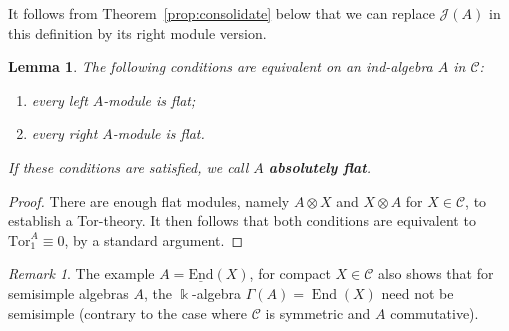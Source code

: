 \documentclass[11pt]{amsart}
\def\End{\operatorname{End}}
\newcommand{\uEnd}{\underline{\mathrm{End}}}
\def\JJ{\mathcal{J}}
\def\cC{\mathscr{C}}
\def\bk{\Bbbk}
\def\Tor{\mathrm{Tor}}
\newtheorem{lemma}[thm]{Lemma}
\theoremstyle{definition}
\theoremstyle{remark}
\newtheorem{remark}[thm]{Remark}
\numberwithin{equation}{section}
\begin{document}
It follows from Theorem~\ref{prop:consolidate} below that we can replace $\JJ(A)$ in this definition by its right module version.


\begin{lemma}
    The following conditions are equivalent on an ind-algebra $A$ in $\cC$:
    \begin{enumerate}
        \item every left $A$-module is flat;
        \item every right $A$-module is flat.
    \end{enumerate}
    If these conditions are satisfied, we call $A$ {\bf absolutely flat}.
\end{lemma}
\begin{proof}
    There are enough flat modules, namely $A\otimes X$ and $X\otimes A$ for $X\in\cC$, to establish a Tor-theory. It then follows that both conditions are equivalent to $\Tor_1^A\equiv0$, by a standard argument.
\end{proof}


\begin{remark}
 The example $A=\uEnd(X)$, for compact $X\in\cC$ also shows that for semisimple algebras $A$, the $\bk$-algebra $\Gamma(A)=\End(X)$ need not be semisimple (contrary to the case where $\cC$ is symmetric and $A$ commutative). 
\end{remark}
\end{document}
